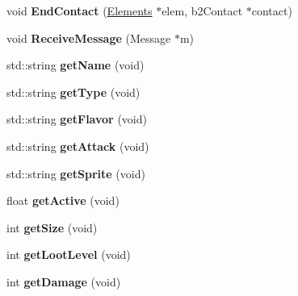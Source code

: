 \begin{DoxyCompactItemize}
\item 
\hypertarget{class_weapon_a1860f840f8c75555de52450300139d9b}{void {\bfseries End\+Contact} (\hyperlink{class_elements}{Elements} $\ast$elem, b2\+Contact $\ast$contact)}\label{class_weapon_a1860f840f8c75555de52450300139d9b}

\item 
\hypertarget{class_weapon_ad93665811c3df9c05bb22b9a1a9c1a66}{void {\bfseries Receive\+Message} (Message $\ast$m)}\label{class_weapon_ad93665811c3df9c05bb22b9a1a9c1a66}

\item 
\hypertarget{class_weapon_aa49263888dca8ee505a95294371adbf6}{std\+::string {\bfseries get\+Name} (void)}\label{class_weapon_aa49263888dca8ee505a95294371adbf6}

\item 
\hypertarget{class_weapon_af382c41490597a51143fec8aea2d136b}{std\+::string {\bfseries get\+Type} (void)}\label{class_weapon_af382c41490597a51143fec8aea2d136b}

\item 
\hypertarget{class_weapon_abe73556e16426da65572d7981dcc800f}{std\+::string {\bfseries get\+Flavor} (void)}\label{class_weapon_abe73556e16426da65572d7981dcc800f}

\item 
\hypertarget{class_weapon_a693e8f30f48b5df1983c22fdf796f25b}{std\+::string {\bfseries get\+Attack} (void)}\label{class_weapon_a693e8f30f48b5df1983c22fdf796f25b}

\item 
\hypertarget{class_weapon_ace3e431278e9ac23f33d222c67c38497}{std\+::string {\bfseries get\+Sprite} (void)}\label{class_weapon_ace3e431278e9ac23f33d222c67c38497}

\item 
\hypertarget{class_weapon_aea6024533cc9ca0ce72139ebf5da33f9}{float {\bfseries get\+Active} (void)}\label{class_weapon_aea6024533cc9ca0ce72139ebf5da33f9}

\item 
\hypertarget{class_weapon_a47baa57bfa8b9bfeda891d3180caa399}{int {\bfseries get\+Size} (void)}\label{class_weapon_a47baa57bfa8b9bfeda891d3180caa399}

\item 
\hypertarget{class_weapon_a64da6983673bfcac2d7de62ab92640f1}{int {\bfseries get\+Loot\+Level} (void)}\label{class_weapon_a64da6983673bfcac2d7de62ab92640f1}

\item 
\hypertarget{class_weapon_a35f92fc79c009c1d1d7d41b4fa17bb11}{int {\bfseries get\+Damage} (void)}\label{class_weapon_a35f92fc79c009c1d1d7d41b4fa17bb11}


\end{DoxyCompactItemize}
